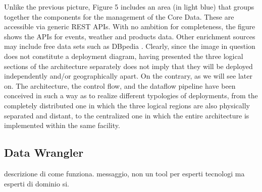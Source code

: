 Unlike the previous picture, Figure 5 includes an area (in light blue) that groups together the components for the management of the Core Data. These are accessible via generic REST APIs. With no ambition for completeness, the figure shows the APIs for events, weather and products data. Other enrichment sources may include free data sets such as DBpedia .
Clearly, since the image in question does not constitute a deployment diagram, having presented the three logical sections of the architecture separately does not imply that they will be deployed independently and/or geographically apart. On the contrary, as we will see later on. The architecture, the control flow, and the dataflow pipeline have been conceived in such a way as to realize different typologies of deployments, from the completely distributed one in which the three logical regions are also physically separated and distant, to the centralized one in which the entire architecture is implemented within the same facility.
   




\subsection{Data Wrangler}
descrizione di come funziona.
messaggio, non un tool per esperti tecnologi ma esperti di dominio si.

